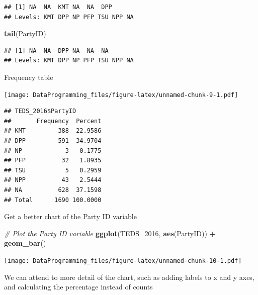 \documentclass[]{book}
\newenvironment{Shaded}{\begin{snugshade}}{\end{snugshade}}
\newcommand{\CommentTok}[1]{\textcolor[rgb]{0.56,0.35,0.01}{\textit{#1}}}
\newcommand{\DecValTok}[1]{\textcolor[rgb]{0.00,0.00,0.81}{#1}}
\newcommand{\KeywordTok}[1]{\textcolor[rgb]{0.13,0.29,0.53}{\textbf{#1}}}
\newcommand{\NormalTok}[1]{#1}
\newcommand{\OperatorTok}[1]{\textcolor[rgb]{0.81,0.36,0.00}{\textbf{#1}}}
\newcommand{\StringTok}[1]{\textcolor[rgb]{0.31,0.60,0.02}{#1}}
\begin{document}
\begin{verbatim}
## [1] NA  NA  KMT NA  NA  DPP
## Levels: KMT DPP NP PFP TSU NPP NA
\end{verbatim}

\begin{Shaded}
\begin{Highlighting}[]
\KeywordTok{tail}\NormalTok{(PartyID)}
\end{Highlighting}
\end{Shaded}

\begin{verbatim}
## [1] NA  NA  DPP NA  NA  NA 
## Levels: KMT DPP NP PFP TSU NPP NA
\end{verbatim}

Frequency table

\begin{Shaded}
\end{Shaded}

\texttt{[image: DataProgramming\_files/figure-latex/unnamed-chunk-9-1.pdf]}

\begin{verbatim}
## TEDS_2016$PartyID 
##       Frequency  Percent
## KMT         388  22.9586
## DPP         591  34.9704
## NP            3   0.1775
## PFP          32   1.8935
## TSU           5   0.2959
## NPP          43   2.5444
## NA          628  37.1598
## Total      1690 100.0000
\end{verbatim}

Get a better chart of the Party ID variable

\begin{Shaded}
\begin{Highlighting}[]
\CommentTok{# Plot the Party ID variable}
\KeywordTok{ggplot}\NormalTok{(TEDS_}\DecValTok{2016}\NormalTok{, }\KeywordTok{aes}\NormalTok{(PartyID)) }\OperatorTok{+}\StringTok{ }
\StringTok{  }\KeywordTok{geom_bar}\NormalTok{()}
\end{Highlighting}
\end{Shaded}

\texttt{[image: DataProgramming\_files/figure-latex/unnamed-chunk-10-1.pdf]}

We can attend to more detail of the chart, such as adding labels to x and y axes, and calculating the percentage instead of counts
\end{document}
